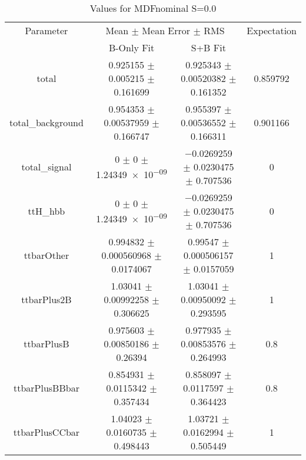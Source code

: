 \begin{table}
\centering
\caption{Values for MDFnominal S=0.0}
\begin{tabular}{cccc}
\toprule
Parameter & \multicolumn{2}{c}{Mean $\pm$ Mean Error $\pm$ RMS} & Expectation\\
 & B-Only Fit & S+B Fit & \\
\midrule
total & \num{0.925155} $\pm$ \num{0.005215} $\pm$ \num{0.161699} & \num{0.925343} $\pm$ \num{0.00520382} $\pm$ \num{0.161352} & \num{0.859792}\\
total\_background & \num{0.954353} $\pm$ \num{0.00537959} $\pm$ \num{0.166747} & \num{0.955397} $\pm$ \num{0.00536552} $\pm$ \num{0.166311} & \num{0.901166}\\
total\_signal & \num{0} $\pm$ \num{0} $\pm$ \num{1.24349e-09} & \num{-0.0269259} $\pm$ \num{0.0230475} $\pm$ \num{0.707536} & \num{0}\\
ttH\_hbb & \num{0} $\pm$ \num{0} $\pm$ \num{1.24349e-09} & \num{-0.0269259} $\pm$ \num{0.0230475} $\pm$ \num{0.707536} & \num{0}\\
ttbarOther & \num{0.994832} $\pm$ \num{0.000560968} $\pm$ \num{0.0174067} & \num{0.99547} $\pm$ \num{0.000506157} $\pm$ \num{0.0157059} & \num{1}\\
ttbarPlus2B & \num{1.03041} $\pm$ \num{0.00992258} $\pm$ \num{0.306625} & \num{1.03041} $\pm$ \num{0.00950092} $\pm$ \num{0.293595} & \num{1}\\
ttbarPlusB & \num{0.975603} $\pm$ \num{0.00850186} $\pm$ \num{0.26394} & \num{0.977935} $\pm$ \num{0.00853576} $\pm$ \num{0.264993} & \num{0.8}\\
ttbarPlusBBbar & \num{0.854931} $\pm$ \num{0.0115342} $\pm$ \num{0.357434} & \num{0.858097} $\pm$ \num{0.0117597} $\pm$ \num{0.364423} & \num{0.8}\\
ttbarPlusCCbar & \num{1.04023} $\pm$ \num{0.0160735} $\pm$ \num{0.498443} & \num{1.03721} $\pm$ \num{0.0162994} $\pm$ \num{0.505449} & \num{1}\\
\bottomrule
\end{tabular}
\end{table}